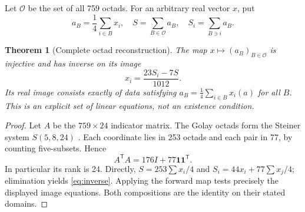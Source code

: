 \documentclass[10pt,reqno]{amsart}
\newtheorem{theorem}{Theorem}
\theoremstyle{remark}\newtheorem{remark}[theorem]{Remark}
\newcommand{\one}{\mathbf1}\newcommand{\Span}{\operatorname{span}}
\begin{document}
Let $\mathcal O$ be the set of all 759 octads. For an arbitrary real vector $x$, put
\[
 a_B=\frac14\sum_{i\in B}x_i,\quad
 S=\sum_{B\in\mathcal O}a_B,\quad
 S_i=\sum_{B\ni i}a_B.
\]
\begin{theorem}[Complete octad reconstruction]\label{thm:reconstruction}
The map $x\mapsto(a_B)_{B\in\mathcal O}$ is injective and has inverse on its image
\begin{equation}\label{eq:inverse}
\boxed{x_i=\frac{23S_i-7S}{1012}.}
\end{equation}
Its real image consists exactly of data satisfying
$a_B=\frac14\sum_{i\in B}x_i(a)$ for all $B$. This is an explicit set of linear equations, not an existence condition.
\end{theorem}
\begin{proof}
Let $A$ be the $759\times24$ indicator matrix. The Golay octads form the Steiner system $S(5,8,24)$ \cite[Theorem 1]{chapman}. Each coordinate lies in 253 octads and each pair in 77, by counting five-subsets. Hence
\[
A^{\mathsf T}A=176I+77\one\one^{\mathsf T}.
\]
In particular its rank is 24. Directly,
$S=253\sum x_i/4$ and $S_i=44x_i+77\sum x_j/4$; elimination yields \eqref{eq:inverse}. Applying the forward map tests precisely the displayed image equations. Both compositions are the identity on their stated domains.
\end{proof}
\end{document}
